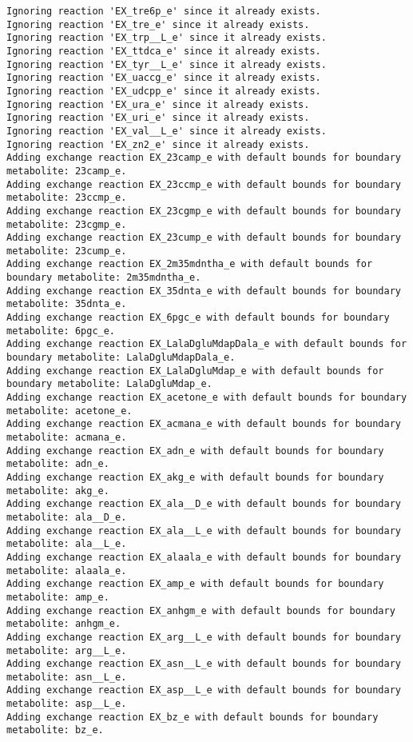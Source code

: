\documentclass[
  letterpaper,
  DIV=11,
  numbers=noendperiod]{scrartcl}
\begin{document}
\begin{verbatim}
Ignoring reaction 'EX_tre6p_e' since it already exists.
Ignoring reaction 'EX_tre_e' since it already exists.
Ignoring reaction 'EX_trp__L_e' since it already exists.
Ignoring reaction 'EX_ttdca_e' since it already exists.
Ignoring reaction 'EX_tyr__L_e' since it already exists.
Ignoring reaction 'EX_uaccg_e' since it already exists.
Ignoring reaction 'EX_udcpp_e' since it already exists.
Ignoring reaction 'EX_ura_e' since it already exists.
Ignoring reaction 'EX_uri_e' since it already exists.
Ignoring reaction 'EX_val__L_e' since it already exists.
Ignoring reaction 'EX_zn2_e' since it already exists.
Adding exchange reaction EX_23camp_e with default bounds for boundary metabolite: 23camp_e.
Adding exchange reaction EX_23ccmp_e with default bounds for boundary metabolite: 23ccmp_e.
Adding exchange reaction EX_23cgmp_e with default bounds for boundary metabolite: 23cgmp_e.
Adding exchange reaction EX_23cump_e with default bounds for boundary metabolite: 23cump_e.
Adding exchange reaction EX_2m35mdntha_e with default bounds for boundary metabolite: 2m35mdntha_e.
Adding exchange reaction EX_35dnta_e with default bounds for boundary metabolite: 35dnta_e.
Adding exchange reaction EX_6pgc_e with default bounds for boundary metabolite: 6pgc_e.
Adding exchange reaction EX_LalaDgluMdapDala_e with default bounds for boundary metabolite: LalaDgluMdapDala_e.
Adding exchange reaction EX_LalaDgluMdap_e with default bounds for boundary metabolite: LalaDgluMdap_e.
Adding exchange reaction EX_acetone_e with default bounds for boundary metabolite: acetone_e.
Adding exchange reaction EX_acmana_e with default bounds for boundary metabolite: acmana_e.
Adding exchange reaction EX_adn_e with default bounds for boundary metabolite: adn_e.
Adding exchange reaction EX_akg_e with default bounds for boundary metabolite: akg_e.
Adding exchange reaction EX_ala__D_e with default bounds for boundary metabolite: ala__D_e.
Adding exchange reaction EX_ala__L_e with default bounds for boundary metabolite: ala__L_e.
Adding exchange reaction EX_alaala_e with default bounds for boundary metabolite: alaala_e.
Adding exchange reaction EX_amp_e with default bounds for boundary metabolite: amp_e.
Adding exchange reaction EX_anhgm_e with default bounds for boundary metabolite: anhgm_e.
Adding exchange reaction EX_arg__L_e with default bounds for boundary metabolite: arg__L_e.
Adding exchange reaction EX_asn__L_e with default bounds for boundary metabolite: asn__L_e.
Adding exchange reaction EX_asp__L_e with default bounds for boundary metabolite: asp__L_e.
Adding exchange reaction EX_bz_e with default bounds for boundary metabolite: bz_e.

\end{verbatim}
\end{document}

